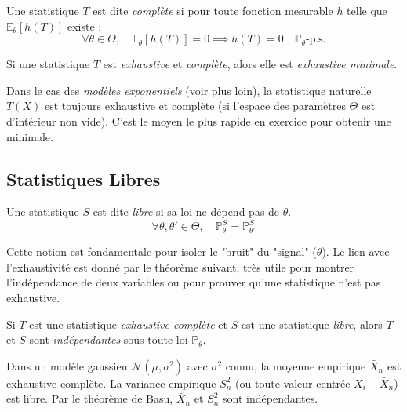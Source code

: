 \begin{definition}
    Une statistique $T$ est dite \emph{complète} si pour toute fonction mesurable $h$ telle que $\mathbb{E}_\theta[h(T)]$ existe :
    $$ \forall \theta \in \Theta, \quad \mathbb{E}_\theta[h(T)] = 0 \implies h(T) = 0 \quad \mathbb{P}_\theta\text{-p.s.} $$
\end{definition}

\begin{theorem}
    Si une statistique $T$ est \emph{exhaustive} et \emph{complète}, alors elle est \emph{exhaustive minimale}.
\end{theorem}

\begin{remark}
    Dans le cas des \emph{modèles exponentiels} (voir plus loin), la statistique naturelle $T(X)$ est toujours exhaustive 
    et complète (si l'espace des paramètres $\Theta$ est d'intérieur non vide). C'est le moyen le plus rapide en exercice 
    pour obtenir une minimale.
\end{remark}

\subsection{Statistiques Libres}

\begin{definition}
    Une statistique $S$ est dite \emph{libre} si sa loi ne dépend pas de $\theta$.
    $$ \forall \theta, \theta' \in \Theta, \quad \mathbb{P}_\theta^S = \mathbb{P}_{\theta'}^S $$
\end{definition}

Cette notion est fondamentale pour isoler le "bruit" du "signal" ($\theta$). Le lien avec l'exhaustivité est donné par 
le théorème suivant, très utile pour montrer l'indépendance de deux variables ou pour prouver qu'une statistique n'est pas exhaustive.

\begin{theorem}
    Si $T$ est une statistique \emph{exhaustive complète} et $S$ est une statistique \emph{libre}, alors $T$ et $S$ 
    sont \emph{indépendantes} sous toute loi $\mathbb{P}_\theta$.
\end{theorem}

\begin{example}
    Dans un modèle gaussien $\mathcal{N}(\mu, \sigma^2)$ avec $\sigma^2$ connu, la moyenne empirique $\bar{X}_n$ est 
    exhaustive complète. La variance empirique $S_n^2$ (ou toute valeur centrée $X_i - \bar{X}_n$) est libre. 
    Par le théorème de Basu, $\bar{X}_n$ et $S_n^2$ sont indépendantes.
\end{example}

